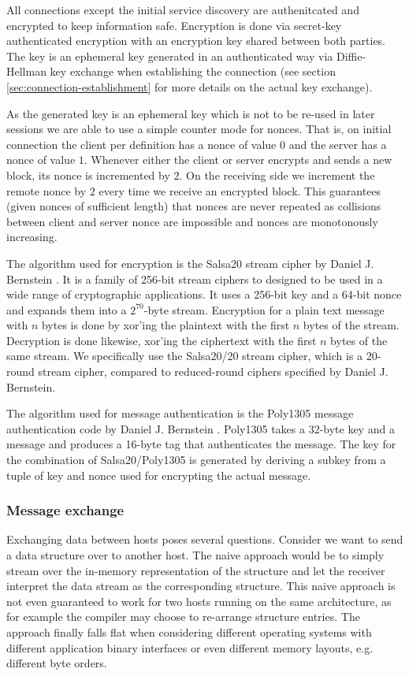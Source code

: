 All connections except the initial service discovery are authenitcated and encrypted to keep information safe.
Encryption is done via secret-key authenticated encryption with an encryption key shared between both parties.
The key is an ephemeral key generated in an authenticated way via Diffie-Hellman key exchange when establishing the connection (see section \ref{sec:connection-establishment} for more details on the actual key exchange).

As the generated key is an ephemeral key which is not to be re-used in later sessions we are able to use a simple counter mode for nonces.
That is, on initial connection the client per definition has a nonce of value $0$ and the server has a nonce of value $1$.
Whenever either the client or server encrypts and sends a new block, its nonce is incremented by $2$.
On the receiving side we increment the remote nonce by $2$ every time we receive an encrypted block.
This guarantees (given nonces of sufficient length) that nonces are never repeated as collisions between client and server nonce are impossible and nonces are monotonously increasing.

The algorithm used for encryption is the Salsa20 stream cipher by Daniel J. Bernstein \cite{bernstein2008salsa}.
It is a family of 256-bit stream ciphers to designed to be used in a wide range of cryptographic applications.
It uses a 256-bit key and a 64-bit nonce and expands them into a $2^{70}$-byte stream.
Encryption for a plain text message with $n$ bytes is done by xor'ing the plaintext with the first $n$ bytes of the stream.
Decryption is done likewise, xor'ing the ciphertext with the first $n$ bytes of the same stream.
We specifically use the Salsa20/20 stream cipher, which is a 20-round stream cipher, compared to reduced-round ciphers specified by Daniel J. Bernstein.

The algorithm used for message authentication is the Poly1305 message authentication code by Daniel J. Bernstein \cite{bernstein2005poly1305}.
Poly1305 takes a 32-byte key and a message and produces a 16-byte tag that authenticates the message.
The key for the combination of Salsa20/Poly1305 is generated by deriving a subkey from a tuple of key and nonce used for encrypting the actual message.

\subsubsection{Message exchange}

Exchanging data between hosts poses several questions.
Consider we want to send a data structure over to another host.
The naive approach would be to simply stream over the in-memory representation of the structure and let the receiver interpret the data stream as the corresponding structure.
This naive approach is not even guaranteed to work for two hosts running on the same architecture, as for example the compiler may choose to re-arrange structure entries.
The approach finally falls flat when considering different operating systems with different application binary interfaces or even different memory layouts, e.g. different byte orders.

